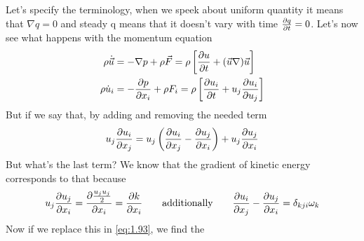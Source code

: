 			Let's specify the terminology, when we speek about uniform quantity it means that $\nabla q = 0$ and steady q means that it doesn't vary with time $\frac{\D q}{\D t}= 0$. Let's now see what happens with the momentum equation
			\begin{equation}
			\begin{aligned}
				\rho \dot{\vec{u}} &= - \nabla p + \rho \vec{F} = \rho \left[\frac{\D u}{\D t} + (\vec{u} \nabla)\vec{u} \right]\\
				\rho \dot{u}_i &= - \frac{\D p}{\D x_i} + \rho F_i = \rho \left[ \frac{\D u_i}{\D t} + u_j \frac{\D u_i}{\D u_j} \right]
			\end{aligned}
			\label{eq:1.93}
			\end{equation}
			But if we say that, by adding and removing the needed term
			\begin{equation}
				u_j \frac{\D u_i}{\D x_j} = u_j \left( \frac{\D u_i}{\D x_j} - \frac{\D u_j}{\D x_i}  \right) + u_j \frac{\D u_j}{\D x_i}
			\end{equation}
			But what's the last term? We know that the gradient of kinetic energy corresponds to that because
			\begin{equation}
				 u_j \frac{\D u_j}{\D x_i} = \frac{\D \frac{u_j u_j}{2}}{\D x_i} = \frac{\D k}{\D x_i} \qquad \mbox{additionally} \qquad \frac{\D u_i}{\D x_j} - \frac{\D u_j}{\D x_i} = \delta _{kji} \omega _k
			\end{equation}
			Now if we replace this in \eqref{eq:1.93}, we find the
			
			\begin{center}
			\end{center}
			
